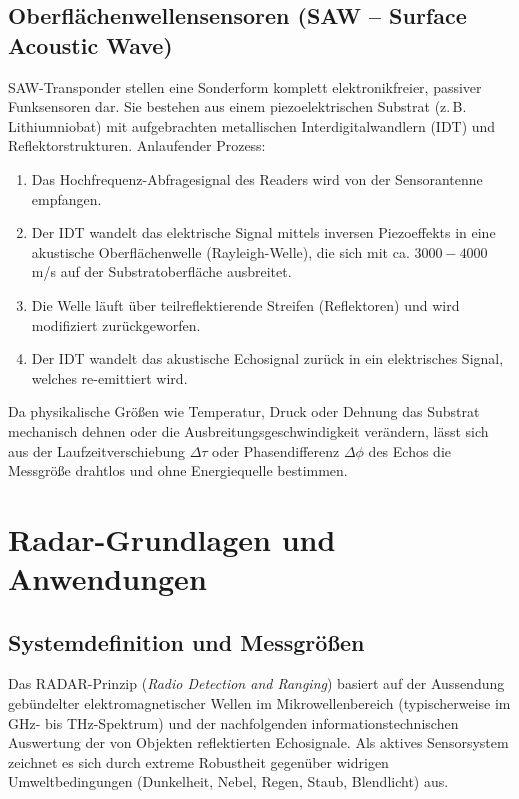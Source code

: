 \documentclass[8pt,a4paper]{article}
\begin{document}
\subsection{Oberflächenwellensensoren (SAW -- Surface Acoustic Wave)}
SAW-Transponder stellen eine Sonderform komplett elektronikfreier, passiver Funksensoren dar. Sie bestehen aus einem piezoelektrischen Substrat (z.\,B. Lithiumniobat) mit aufgebrachten metallischen Interdigitalwandlern (IDT) und Reflektorstrukturen.
Anlaufender Prozess:
\begin{enumerate}
    \item Das Hochfrequenz-Abfragesignal des Readers wird von der Sensorantenne empfangen.
    \item Der IDT wandelt das elektrische Signal mittels inversen Piezoeffekts in eine akustische Oberflächenwelle (Rayleigh-Welle), die sich mit ca. $3000-4000$\,m/s auf der Substratoberfläche ausbreitet.
    \item Die Welle läuft über teilreflektierende Streifen (Reflektoren) und wird modifiziert zurückgeworfen.
    \item Der IDT wandelt das akustische Echosignal zurück in ein elektrisches Signal, welches re-emittiert wird.
\end{enumerate}
Da physikalische Größen wie Temperatur, Druck oder Dehnung das Substrat mechanisch dehnen oder die Ausbreitungsgeschwindigkeit verändern, lässt sich aus der Laufzeitverschiebung $\Delta \tau$ oder Phasendifferenz $\Delta \phi$ des Echos die Messgröße drahtlos und ohne Energiequelle bestimmen.

\newpage

\section{Radar-Grundlagen und Anwendungen}

\subsection{Systemdefinition und Messgrößen}
Das RADAR-Prinzip (\textit{Radio Detection and Ranging}) basiert auf der Aussendung gebündelter elektromagnetischer Wellen im Mikrowellenbereich (typischerweise im GHz- bis THz-Spektrum) und der nachfolgenden informationstechnischen Auswertung der von Objekten reflektierten Echosignale. Als aktives Sensorsystem zeichnet es sich durch extreme Robustheit gegenüber widrigen Umweltbedingungen (Dunkelheit, Nebel, Regen, Staub, Blendlicht) aus.
\end{document}
